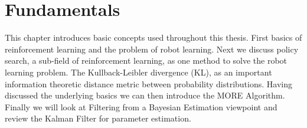 
\chapter{Fundamentals}
This chapter introduces basic concepts used throughout this thesis.
First basics of reinforcement learning and the problem of robot learning.
Next we discuss policy search, a sub-field of reinforcement learning,
as one method to solve the robot learning problem.
The Kullback-Leibler divergence (KL), as an important information theoretic
distance metric between probability distributions.
Having discussed the underlying basics we can then
introduce the MORE Algorithm.
Finally we will look at Filtering from a Bayesian Estimation viewpoint and
review the Kalman Filter for parameter estimation.

